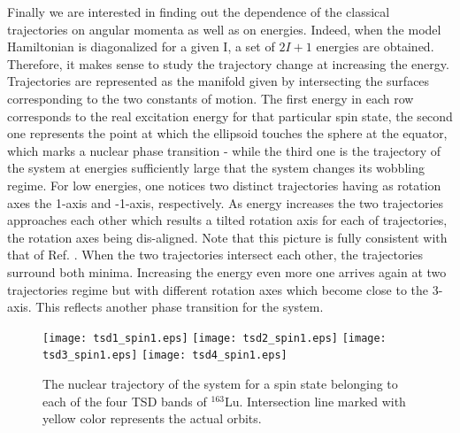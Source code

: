 \documentclass[twocolumn,article,amsmath,amssymb,floatfix,aps]{revtex4}
\begin{document}
Finally we are interested in finding out the dependence of the classical trajectories on angular momenta as well as on energies.  Indeed, when the model Hamiltonian is diagonalized for a given I,  a set of $2I+1$ energies are obtained.  Therefore, it makes sense to study the trajectory change at increasing the energy. Trajectories are represented as the manifold given by intersecting the surfaces corresponding to the two constants of motion.  The first energy in each row corresponds to the real excitation energy  for that particular spin state, the second one represents the point at which the ellipsoid touches the sphere at the equator, which marks a nuclear phase transition - while the third one is the trajectory of the system at energies sufficiently large that the system changes its wobbling regime.  For low energies, one notices two distinct trajectories having as rotation axes the 1-axis and -1-axis, respectively.  As energy increases the two trajectories approaches each other which results a tilted rotation axis for each of trajectories, the rotation axes being dis-aligned.  Note that this picture is fully consistent with that of Ref. \cite{Lawr}. When the two trajectories intersect each other, the trajectories surround both minima.  Increasing the energy even more one arrives again at two trajectories regime but with different rotation axes which become close to the 3-axis.  This reflects another phase transition for the system. 

\begin{figure}
    \centering
    \texttt{[image: tsd1\_spin1.eps]}
    \texttt{[image: tsd2\_spin1.eps]}
    \texttt{[image: tsd3\_spin1.eps]}
    \texttt{[image: tsd4\_spin1.eps]}
    \caption{The nuclear trajectory of the system for a spin state belonging to each of the four TSD bands of $^{163}$Lu.  Intersection line marked with yellow color represents the actual orbits. }
    \label{ellipsoids-tsd1}
\end{figure}
\end{document}
